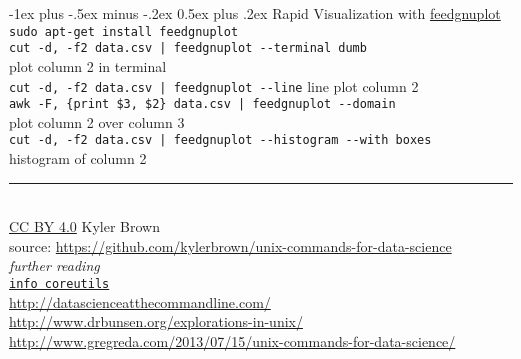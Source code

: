 \documentclass[10pt]{article}
\makeatletter
\renewcommand{\section}{\@startsection{section}{1}{0mm}%
                                {-1ex plus -.5ex minus -.2ex}%
                                {0.5ex plus .2ex}%
                                {\normalfont\large\bfseries}}
\newcommand{\q}{\textquotesingle } %
\makeatother
\begin{document}
\begin{multicols}{2}
\section{Rapid Visualization with \href{https://github.com/dkogan/feedgnuplot}{feedgnuplot}}
{\tt sudo apt-get install feedgnuplot}\\
{\tt cut -d, -f2 data.csv | feedgnuplot -{}-terminal \q dumb\q} \\
	\hfill plot column 2 in terminal\\
{\tt  cut -d, -f2  data.csv | feedgnuplot -{}-line} \hfill line plot column 2\\
{\tt awk -F, \q\{print \$3, \$2\}\q\  data.csv | feedgnuplot -{}-domain} \\
	\hfill plot column 2 over column 3\\
{\tt cut -d, -f2   data.csv | feedgnuplot -{}-histogram -{}-with boxes}\\
	\hfill histogram of column 2\\

\rule{0.3\linewidth}{0.25pt}\\
\scriptsize
\href{https://creativecommons.org/licenses/by/4.0/}{CC BY 4.0} Kyler Brown\\
source: \url{https://github.com/kylerbrown/unix-commands-for-data-science}\\

\textit{further reading}\\
\href{https://www.gnu.org/software/coreutils/manual/coreutils.html}{{\tt info coreutils}}\\
\url{http://datascienceatthecommandline.com/}\\
\url{http://www.drbunsen.org/explorations-in-unix/}\\
\url{http://www.gregreda.com/2013/07/15/unix-commands-for-data-science/}\\


\end{multicols}
\end{document}
